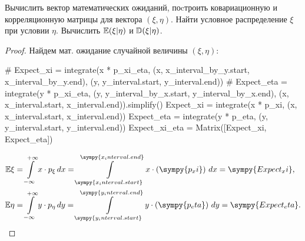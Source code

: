 \begin{problem}
Вычислить вектор математических ожиданий, поcтроить ковариационную и корреляционную матрицы для вектора $(\xi,\eta)$. Найти условное распределение $\xi$ при условии $\eta$. Вычислить $\mathbb E(\xi|\eta)$ и $\mathbb D(\xi|\eta)$.
\end{problem}
\begin{proof}
    Найдем мат. ожидание случайной величины $(\xi,\eta)$:
    \begin{sympycode}
# Expect_xi = integrate(x * p_xi_eta, (x, x_interval_by_y.start, x_interval_by_y.end), (y, y_interval.start, y_interval.end))
# Expect_eta = integrate(y * p_xi_eta,  (y, y_interval_by_x.start, y_interval_by_x.end), (x, x_interval.start, x_interval.end)).simplify()
Expect_xi = integrate(x * p_xi, (x, x_interval.start, x_interval.end))
Expect_eta = integrate(y * p_eta, (y, y_interval.start, y_interval.end))
Expect_xi_eta = Matrix([Expect_xi, Expect_eta])
    \end{sympycode}
    \[
        \begin{aligned}
            \Expect \xi
             & = \int\limits_{-\infty}^{+\infty} x \cdot p_\xi \, dx
            = \int\limits_{\sympy{x_interval.start}}^{\sympy{x_interval.end}} x \cdot \left(\sympy{p_xi} \right)\, dx
            = \sympy{Expect_xi},                                      \\
            \Expect \eta
             & = \int\limits_{-\infty}^{+\infty} y \cdot p_\eta \, dy
            = \int\limits_{\sympy{y_interval.start}}^{\sympy{y_interval.end}} y \cdot \left(\sympy{p_eta}\right) \, dy
            = \sympy{Expect_eta}.
        \end{aligned}
    \]


\end{proof}
